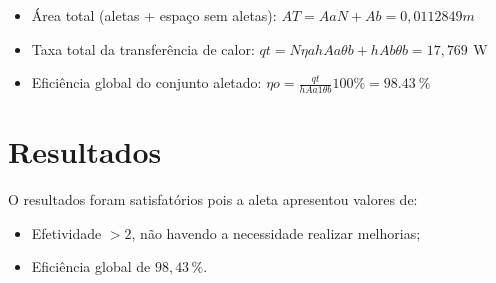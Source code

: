\begin{itemize}[leftmargin=2cm]
    \item Área total (aletas + espaço sem aletas): \(
          {AT}={{Aa}{N}+{Ab}} = {0,0112849}m
          \)
    \item Taxa total da transferência de calor: \(
          {qt}=
          {{N}{{\eta}a}{h}{Aa}{{\theta}b}}+{{h}{Ab}{{\theta}b}}=
              {17,769\,\SI{}\watt}
          \)
    \item Eficiência global do conjunto aletado: \(
          {\eta}o=
          {\frac{qt}{{h}{Aa1}{\theta}b}}{100\%}=
          {\SI{98,43}{\percent}}
          \)
\end{itemize}

\section{
  Resultados
 }\label{sec:results}

 O resultados foram satisfatórios pois a aleta apresentou valores de:
 \begin{itemize}[leftmargin=2cm]
    \item Efetividade \boldmath\(> 2\), não havendo a necessidade realizar melhorias;
    \item Eficiência global de \boldmath\(98,43\,\%\).
\end{itemize}